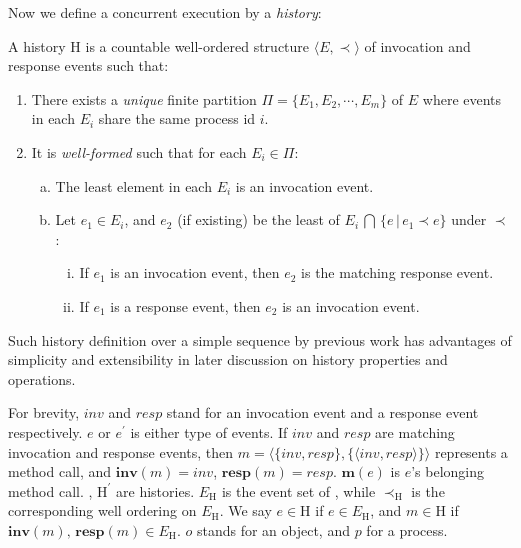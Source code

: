 \documentclass[a4paper,USenglish]{lipics-v2016}
\newcommand{\myinv}{\textbf{inv}}
\newcommand{\myresp}{\textbf{resp}}
\newcommand{\mym}{\textbf{m}}
\newcommand{\his}{\text{H}}
\newcommand{\evts}{\textit{E}}
\newcommand{\myvert}{\vert}
\begin{document}
Now we define a concurrent execution by a \textit{history}:
\begin{definition}\label{def_his}
	A history $\his$ is a countable well-ordered structure $\langle \evts, \prec \rangle$ of invocation and response events such that:
	\begin{enumerate}[(1)]
		\item
		There exists a \textit{unique} finite partition $\Pi = \{\evts_1, \evts_2, \cdots, \evts_m\}$ of $\evts$
		where events in each $\evts_i$ share the same process id $i$.
		\item
		It is \textit{well-formed} such that for each $\evts_i \in \Pi$:
		\begin{enumerate}[(a)]
			\item
			The least element in each $\evts_i$ is an invocation event.
			\item
			Let $e_1 \in \evts_i$, and $e_2$ (if existing) be the least of $\evts_i \, \bigcap \, \{e \, \myvert \, e_1 \prec e\}$ under $\prec$:
			\begin{enumerate}[(i)]
				\item
				If $e_1$ is an invocation event, then $e_2$ is the matching response event.
				\item
				If $e_1$ is a response event, then $e_2$ is an invocation event.
			\end{enumerate}
		\end{enumerate}
	\end{enumerate}
\end{definition}
Such history definition over a simple sequence by previous work has advantages of simplicity and extensibility 
in later discussion on history properties and operations.

For brevity, $inv$ and $resp$ stand for an invocation event and a response event respectively.
$e$ or $e^\prime$ is either type of events.
If $inv$ and $resp$ are matching invocation and response events,
then $m = \langle \{inv, resp\}, \{\langle inv, resp\rangle\} \rangle$ represents a method call,
and $\myinv(m) = inv$, $\myresp(m) = resp$.
$\mym(e)$ is $e$'s belonging method call.
{\his}, $\his^\prime$ are histories.
$\evts_{\his}$ is the event set of {\his}, while $\prec_{\his}$ is the corresponding well ordering on $\evts_{\his}$.
We say $e \in \his$ if $e \in \evts_{\his}$, and $m \in \his$ if $\myinv(m),\, \myresp(m) \in \evts_{\his}$.
$o$ stands for an object, and $p$ for a process.
\end{document}
